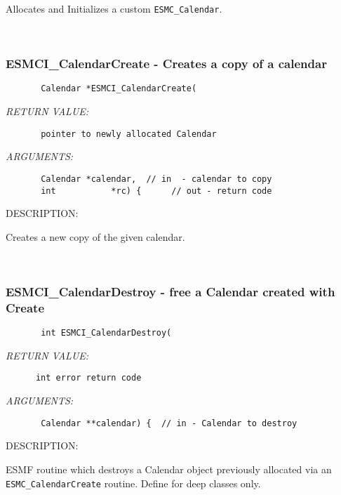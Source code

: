         Allocates and Initializes a custom {\tt ESMC\_Calendar}.
   
 
\mbox{}\hrulefill\ 
 
\subsubsection [ESMCI\_CalendarCreate] {ESMCI\_CalendarCreate - Creates a copy of a calendar}


  
\begin{verbatim}       Calendar *ESMCI_CalendarCreate(\end{verbatim}{\em RETURN VALUE:}
\begin{verbatim}       pointer to newly allocated Calendar\end{verbatim}{\em ARGUMENTS:}
\begin{verbatim}       Calendar *calendar,  // in  - calendar to copy
       int           *rc) {      // out - return code 
 \end{verbatim}
{\sf DESCRIPTION:\\ }


        Creates a new copy of the given calendar.
   
 
\mbox{}\hrulefill\ 
 
\subsubsection [ESMCI\_CalendarDestroy] {ESMCI\_CalendarDestroy - free a Calendar created with Create}


  
\begin{verbatim}       int ESMCI_CalendarDestroy(\end{verbatim}{\em RETURN VALUE:}
\begin{verbatim}      int error return code\end{verbatim}{\em ARGUMENTS:}
\begin{verbatim}       Calendar **calendar) {  // in - Calendar to destroy\end{verbatim}
{\sf DESCRIPTION:\\ }


        ESMF routine which destroys a Calendar object previously allocated
        via an {\tt ESMC\_CalendarCreate} routine. Define for deep classes only.
   
